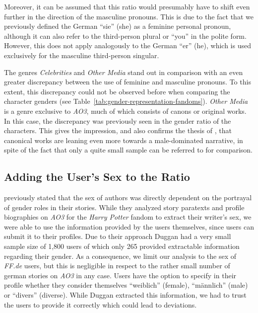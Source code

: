 Moreover, it can be assumed that this ratio would presumably have to shift even further in the direction of the masculine pronouns.
This is due to the fact that we previously defined the German ``sie'' (she) as a feminine personal pronoun, although it can also refer to the third-person plural or ``you'' in the polite form.
However, this does not apply analogously to the German ``er'' (he), which is used exclusively for the masculine third-person singular.

The genres \emph{Celebrities} and \emph{Other Media} stand out in comparison with an even greater discrepancy between the use of feminine and masculine pronouns.
To this extent, this discrepancy could not be observed before when comparing the character genders (see Table~\ref{tab:gender-representation-fandoms}).
\emph{Other Media} is a genre exclusive to \emph{AO3}, much of which consists of canons or original works.
In this case, the discrepancy was previously seen in the gender ratio of the characters.
This gives the impression, and also confirms the thesis of \citet{Milli2016BeyondFanfiction}, that canonical works are leaning even more towards a male-dominated narrative, in spite of the fact that only a quite small sample can be referred to for comparison.

\subsection{Adding the User's Sex to the Ratio}\label{subsec:user-sex-comparisons}

\citet{Duggan2020WhoAO3} previously stated that the sex of authors was directly dependent on the portrayal of gender roles in their stories.
While they analyzed story paratexts and profile biographies on \emph{AO3} for the \emph{Harry Potter} fandom to extract their writer's sex, we were able to use the information provided by the users themselves, since users can submit it to their profiles.
Due to their approach Duggan had a very small sample size of 1,800 users of which only 265 provided extractable information regarding their gender.
As a consequence, we limit our analysis to the sex of \emph{FF.de} users, but this is negligible in respect to the rather small number of german stories on \emph{AO3} in any case.
Users have the option to specify in their profile whether they consider themselves ``weiblich'' (female), ``männlich'' (male) or ``divers'' (diverse).
While Duggan extracted this information, we had to trust the users to provide it correctly which could lead to deviations.

